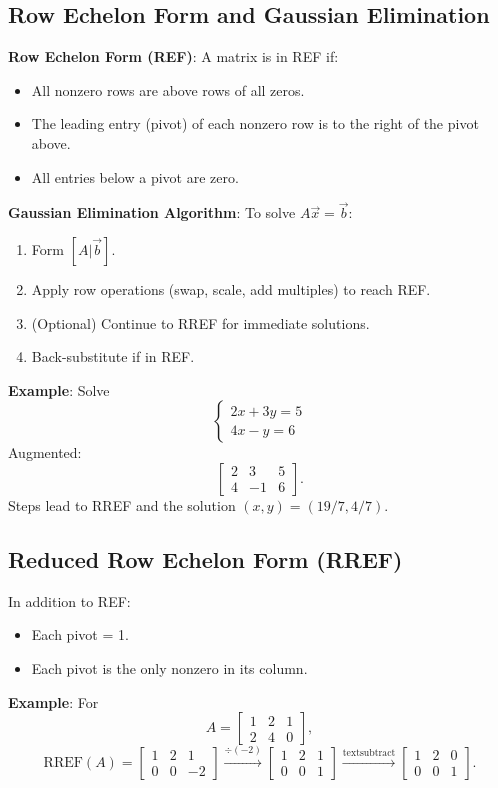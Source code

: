 \documentclass{article}
\begin{document}
\begin{multicols}{2}
\subsection*{Row Echelon Form and Gaussian Elimination}

\textbf{Row Echelon Form (REF)}:
A matrix is in REF if:
\begin{itemize}
  \item All nonzero rows are above rows of all zeros.
  \item The leading entry (pivot) of each nonzero row is to the right of the pivot above.
  \item All entries below a pivot are zero.
\end{itemize}

\textbf{Gaussian Elimination Algorithm}: To solve $A\vec{x}= \vec{b}$:
\begin{enumerate}
  \item Form $[A|\vec{b}]$.
  \item Apply row operations (swap, scale, add multiples) to reach REF.
  \item (Optional) Continue to RREF for immediate solutions.
  \item Back-substitute if in REF.
\end{enumerate}

\textbf{Example}: Solve
\[
\begin{cases}
2x + 3y = 5 \\
4x - y = 6
\end{cases}
\]
Augmented:
\[
\left[\begin{array}{cc|c}
2 & 3 & 5 \\
4 & -1 & 6
\end{array}\right].
\]
Steps lead to RREF and the solution $(x,y)=(19/7,4/7)$.

\subsection*{Reduced Row Echelon Form (RREF)}
In addition to REF:
\begin{itemize}
  \item Each pivot = 1.
  \item Each pivot is the only nonzero in its column.
\end{itemize}

\textbf{Example}: For
\[
A=\begin{bmatrix}1 & 2 & 1\\2 & 4 & 0\end{bmatrix},
\]
\[
\mathrm{RREF}(A)=\begin{bmatrix}1 & 2 & 1\\0 & 0 & -2\end{bmatrix}\xrightarrow{\div(-2)}\begin{bmatrix}1 & 2 & 1\\0 & 0 & 1\end{bmatrix}\xrightarrow{\text{textsubtract}}\begin{bmatrix}1 & 2 & 0\\0 & 0 & 1\end{bmatrix}.
\]

\end{multicols}
\end{document}
